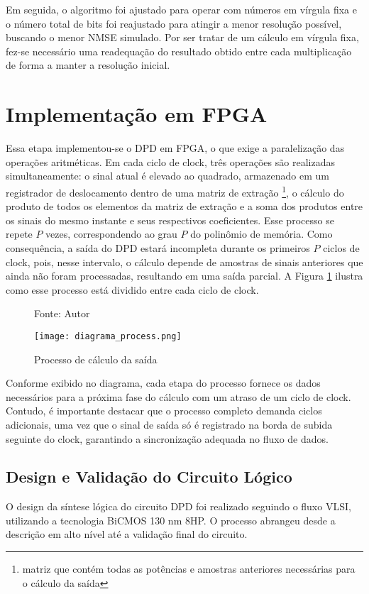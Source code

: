Em seguida, o algoritmo foi ajustado para operar com números em vírgula fixa e o número total de bits foi reajustado para atingir a menor resolução possível, buscando o menor NMSE simulado. Por ser tratar de um cálculo em vírgula fixa, fez-se necessário uma readequação do resultado obtido entre cada multiplicação de forma a manter a resolução inicial.

\section{Implementação em FPGA}
Essa etapa implementou-se o DPD em FPGA, o que exige a paralelização das operações aritméticas. Em cada ciclo de clock, três operações são realizadas simultaneamente: o sinal atual é elevado ao quadrado, armazenado em um registrador de deslocamento dentro de uma matriz de extração \footnote{matriz que contém todas as potências e amostras anteriores necessárias para o cálculo da saída}, o cálculo do produto de todos os elementos da matriz de extração e a soma dos produtos entre os sinais do mesmo instante e seus respectivos coeficientes. Esse processo se repete \( P \) vezes, correspondendo ao grau \( P \) do polinômio de memória. Como consequência, a saída do DPD estará incompleta durante os primeiros \( P \) ciclos de clock, pois, nesse intervalo, o cálculo depende de amostras de sinais anteriores que ainda não foram processadas, resultando em uma saída parcial.
 A Figura \ref{fig:diagramaprocess} ilustra como esse processo está dividido entre cada ciclo de clock.
 
\begin{figure}[htbp!]
  \centering
  \captionsetup{justification=centering}
  \caption*{Fonte: Autor}
  \texttt{[image: diagrama\_process.png]}
  \caption{Processo de cálculo da saída}
  \label{fig:diagramaprocess}
\end{figure}
Conforme exibido no diagrama, cada etapa do processo fornece os dados necessários para a próxima fase do cálculo com um atraso de um ciclo de clock. Contudo, é importante destacar que o processo completo demanda ciclos adicionais, uma vez que o sinal de saída só é registrado na borda de subida seguinte do clock, garantindo a sincronização adequada no fluxo de dados.

\subsection{Design e Validação do Circuito Lógico}  
O design da síntese lógica do circuito DPD foi realizado seguindo o fluxo VLSI, utilizando a tecnologia BiCMOS 130 nm 8HP. O processo abrangeu desde a descrição em alto nível até a validação final do circuito.  

